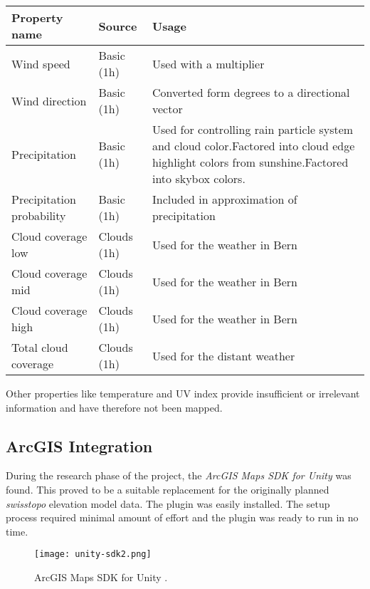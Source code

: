 \begin{tabularx}{\linewidth}{|l|l|X|}
    \hline
    \textbf{Property name}      & \textbf{Source}     & \textbf{Usage}                                 \\ \hline
    Wind speed                  & Basic (1h)          & Used with a multiplier                         \\ \hline
    Wind direction              & Basic (1h)          & Converted form degrees to a directional vector \\ \hline
    Precipitation               & Basic (1h)          & Used for controlling rain particle system and cloud color.\newline Factored into cloud edge highlight colors from sunshine.\newline Factored into skybox colors. \\ \hline
    Precipitation probability   & Basic (1h)          & Included in approximation of precipitation     \\ \hline
    Cloud coverage low          & Clouds (1h)         & Used for the weather in Bern                   \\ \hline
    Cloud coverage mid          & Clouds (1h)         & Used for the weather in Bern                   \\ \hline
    Cloud coverage high         & Clouds (1h)         & Used for the weather in Bern                   \\ \hline
    Total cloud coverage        & Clouds (1h)         & Used for the distant weather                   \\ \hline
\end{tabularx}
\emptyline
Other properties like temperature and UV index provide insufficient or irrelevant information and have therefore not been mapped.

\clearpage

\subsection{ArcGIS Integration}
\label{section:techimpl:arcgis}
During the research phase of the project, the \emph{ArcGIS Maps SDK for Unity} \cite{arcgis:unitysdk} was found. This proved to be a suitable replacement for the originally planned \emph{swisstopo} elevation model data.
The plugin was easily installed. The setup process required minimal amount of effort and the plugin was ready to run in no time. 

\begin{figure}[H]
    \texttt{[image: unity-sdk2.png]}
    \caption{ArcGIS Maps SDK for Unity \protect\cite{arcgis:unitysdk}.}
\end{figure}

